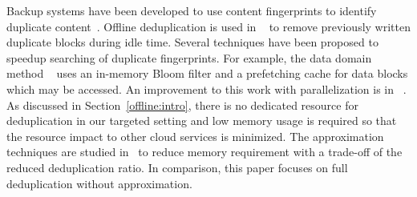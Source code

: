 Backup systems have been developed to use content fingerprints to identify duplicate
content~\cite{venti02,Rhea2008}.
Offline deduplication is
used in ~\cite{EMC,NetAppOffline} to remove previously written duplicate blocks during idle time.
Several techniques have been proposed to speedup searching of duplicate
fingerprints. For example, the data domain method ~\cite{bottleneck08}
uses  an in-memory Bloom filter and a prefetching cache for data blocks  which may be
accessed.  An improvement to this work with parallelization is in ~\cite{MAD210,DEBAR}.
As discussed in Section~\ref{offline:intro},
there is no dedicated resource for deduplication in our targeted setting and low memory usage
 is required so that the resource impact to other cloud services is minimized.
The approximation techniques are studied in~\cite{extreme_binning09,Guo2011}
to reduce memory requirement with a trade-off of the reduced deduplication ratio.
In comparison, this paper focuses on  full deduplication without approximation.

